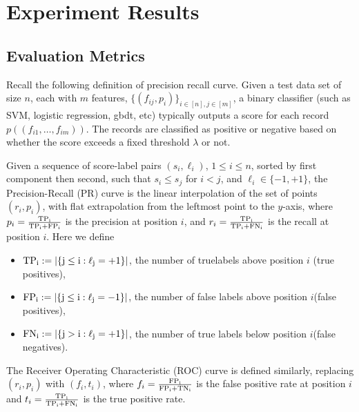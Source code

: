\section{Experiment Results}
\subsection{Evaluation Metrics}
 Recall the following definition of precision recall curve. Given a test data set of size $n$, each with $m$ features, $\{(f_{ij}, p_i)\}_{i \in [n], j \in [m]}$, a binary classifier (such as SVM, logistic regression, gbdt, etc) typically outputs a score for each record $p((f_{i1}, \ldots, f_{im}))$.  The records are classified as positive or negative based on whether the score exceeds a fixed threshold $\lambda$ or not. 
\begin{definition}
Given a sequence of score-label pairs $(s_i,\ell_i)$, $1 \le i \le n$, sorted by first component then second, such that $s_i \le s_j$ for $i< j$, and $\ell_i \in \{-1,+1\}$, the Precision-Recall (PR) curve is the linear interpolation of the set of points $(r_i,p_i)$, with flat extrapolation from the leftmost point to the $y$-axis, where $p_i = \frac{\rm{TP}_i}{\rm{TP}_i + \rm{FP}_i}$ is the precision at position $i$, and $r_i =\frac{\rm{TP}_i}{\rm{TP}_i + \rm{FN}_i}$ is the recall at position $i$. Here we define
\begin{itemize}
\item $\rm{TP}_i := |\{j \le i: \ell_j =+1\}|$, the number of truelabels above position $i$ (true positives),
\item $\rm{FP}_i := |\{j \le i: \ell_j =-1\}|$, the number of false labels above position $i$(false positives),
\item $\rm{FN}_i := |\{j > i: \ell_j = +1\}|$, the number of true labels below position $i$(false negatives).
\end{itemize}
\end{definition}

\begin{definition}
The Receiver Operating Characteristic (ROC) curve is defined similarly, replacing $(r_i,p_i)$ with $(f_i, t_i)$, where $f_i = \frac{\rm{FP}_i}{\rm{FP}_i + \rm{TN}_i}$ is the false positive rate at position $i$ and $t_i = \frac{\rm{TP}_i}{\rm{TP}_i + \rm{FN}_i}$ is the true positive rate. 
\end{definition}

